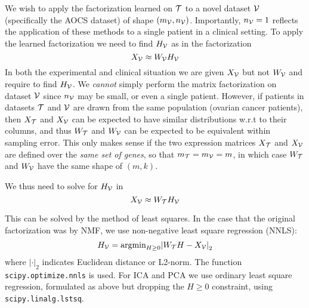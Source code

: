 \documentclass[tikz, 11pt,a4paper,oneside,fleqn]{article}
\begin{document}
We wish to apply the factorization learned on $\mathcal{T}$ to a novel dataset $\mathcal{V}$ (specifically the AOCS dataset) of shape $(m_{\mathcal{V}}, n_{\mathcal{V}})$. 
Importantly, $n_{\mathcal{V}} = 1$ reflects the application of these methods to a single patient in a clinical setting.  To apply the learned factorization we need to find $H_{\mathcal{V}}$ as in the factorization
\begin{equation}
	X_{\mathcal{V}} \approx W_{\mathcal{V}} H_{\mathcal{V}}
\end{equation}
In both the experimental and clinical situation we are given $X_{\mathcal{V}}$ but not $W_{\mathcal{V}}$ and require to find $H_{\mathcal{V}}$. 
We \emph{cannot} simply perform the matrix factorization on dataset $\mathcal{V}$ since $n_{\mathcal{V}}$ may be small, or even a single patient.   
However, if patients in datasets $\mathcal{T}$ and $\mathcal{V}$ are drawn from the same population (ovarian cancer patients), then $X_{\mathcal{T}}$ and $X_{\mathcal{V}}$ can be expected to have similar distributions w.r.t to their columns, and thus $W_{\mathcal{T}}$ and $W_{\mathcal{V}}$ can be expected to be equivalent within sampling error.  
This only makes sense if the two expression matrices $X_{\mathcal{T}}$ and $X_{\mathcal{V}}$ are defined over the \emph{same set of genes}, so that $m_{\mathcal{T}} = m_{\mathcal{V}} = m$, in which case $W_{\mathcal{T}}$ and $W_{\mathcal{V}}$ have the same shape of $(m, k)$.   

We thus need to solve for $H_{\mathcal{V}}$ in
\begin{equation}
	X_{\mathcal{V}}  \approx  W_{\mathcal{T}} H_{\mathcal{V}} \label{eq_Xv_WtHv}
\end{equation}

This can be solved by the method of least squares.  In the case that the original factorization was by NMF, we use non-negative least square regression (NNLS):
\begin{equation}
	H_{\mathcal{V}} = \mbox{argmin}_{H\geq 0}{\lvert W_{\mathcal{T}} H - X_{\mathcal{V}} \rvert}_2
	\label{eq_Hv_WdtXv}
\end{equation}
where ${\lvert \mathbf{\cdot} \rvert}_2$ indicates Euclidean distance or L2-norm.
The function {\tt scipy.optimize.nnls} is used.
For ICA and PCA we use ordinary least square regression, formulated as above but dropping the $H\geq 0$ constraint, using {\tt scipy.linalg.lstsq}.

\end{document}
